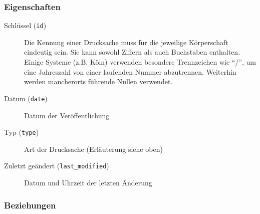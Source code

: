 \documentclass[,a4paper]{article}
\begin{document}
\subsubsection{Eigenschaften}

\begin{description}
\item[Schlüssel (\texttt{id})]
Die Kennung einer Drucksache muss für die jeweilige Körperschaft
eindeutig sein. Sie kann sowohl Ziffern als auch Buchstaben enthalten.
Einige Systeme (z.B. Köln) verwenden besondere Trennzeichen wie ``/'',
um eine Jahreszahl von einer laufenden Nummer abzutrennen. Weiterhin
werden mancherorts führende Nullen verwendet.
\item[Datum (\texttt{date})]
Datum der Veröffentlichung
\item[Typ (\texttt{type})]
Art der Drucksache (Erläuterung siehe oben)
\item[Zuletzt geändert (\texttt{last\_modified})]
Datum und Uhrzeit der letzten Änderung
\end{description}

\subsubsection{Beziehungen}
\end{document}
